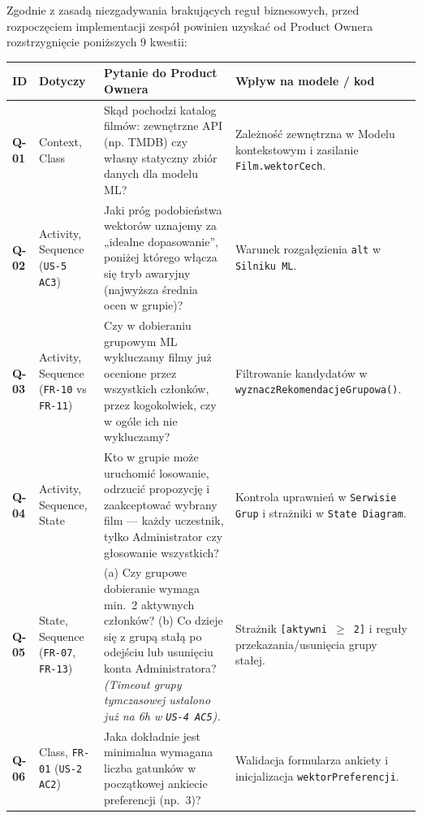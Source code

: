 \documentclass[10pt,a4paper]{article}
\begin{document}
Zgodnie z zasadą niezgadywania brakujących reguł biznesowych, przed rozpoczęciem implementacji zespół powinien uzyskać od Product Ownera rozstrzygnięcie poniższych 9 kwestii:

{\small
\setlength{\tabcolsep}{5pt}
\begin{longtable}{>{\bfseries}p{1.0cm} >{\raggedright\arraybackslash}p{2.4cm} >{\raggedright\arraybackslash}p{7.1cm} >{\raggedright\arraybackslash}p{5.2cm}}
\toprule
\rowcolor{Navy}
{\color{white}ID} & {\color{white}\textbf{Dotyczy}} & {\color{white}\textbf{Pytanie do Product Ownera}} & {\color{white}\textbf{Wpływ na modele / kod}} \\
\midrule
\endhead
\bottomrule
\endfoot
Q-01 & Context, Class & Skąd pochodzi katalog filmów: zewnętrzne API (np. TMDB) czy własny statyczny zbiór danych dla modelu ML? & Zależność zewnętrzna w Modelu kontekstowym i zasilanie \texttt{Film.wektorCech}. \\
\rowcolor{RowAlt}
Q-02 & Activity, Sequence (\texttt{US-5 AC3}) & Jaki próg podobieństwa wektorów uznajemy za „idealne dopasowanie”, poniżej którego włącza się tryb awaryjny (najwyższa średnia ocen w grupie)? & Warunek rozgałęzienia \texttt{alt} w \texttt{Silniku ML}. \\
Q-03 & Activity, Sequence (\texttt{FR-10} vs \texttt{FR-11}) & Czy w dobieraniu grupowym ML wykluczamy filmy już ocenione przez wszystkich członków, przez kogokolwiek, czy w ogóle ich nie wykluczamy? & Filtrowanie kandydatów w \texttt{wyznaczRekomendacje\allowbreak Grupowa()}. \\
\rowcolor{RowAlt}
Q-04 & Activity, Sequence, State & Kto w grupie może uruchomić losowanie, odrzucić propozycję i zaakceptować wybrany film — każdy uczestnik, tylko Administrator czy głosowanie wszystkich? & Kontrola uprawnień w \texttt{Serwisie Grup} i strażniki w \texttt{State Diagram}. \\
Q-05 & State, Sequence (\texttt{FR-07}, \texttt{FR-13}) & (a) Czy grupowe dobieranie wymaga min.~2 aktywnych członków? (b) Co dzieje się z grupą stałą po odejściu lub usunięciu konta Administratora? \textit{(Timeout grupy tymczasowej ustalono już na 6h w \texttt{US-4 AC5}).} & Strażnik \texttt{[aktywni $\ge$ 2]} i reguły przekazania/usunięcia grupy stałej. \\
\rowcolor{RowAlt}
Q-06 & Class, \texttt{FR-01} (\texttt{US-2 AC2}) & Jaka dokładnie jest minimalna wymagana liczba gatunków w początkowej ankiecie preferencji (np.~3)? & Walidacja formularza ankiety i inicjalizacja \texttt{wektorPreferencji}. \\

\end{longtable}}
\end{document}
